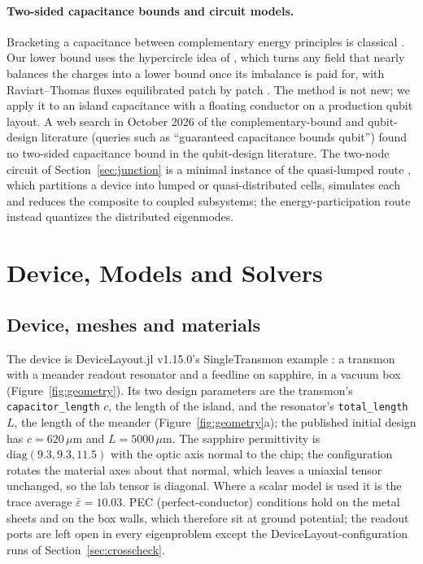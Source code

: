 \documentclass{anvil-paper}
\begin{document}
\paragraph{Two-sided capacitance bounds and circuit models.}
Bracketing a capacitance between complementary energy principles is
classical \citep{specogna2011complementary}. Our lower bound uses the
hypercircle idea of \citet{prager1947approximations}, which turns any
field that nearly balances the charges into a lower bound once its
imbalance is paid for, with Raviart--Thomas
fluxes \citep{raviart1977mixed} equilibrated patch by patch
\citep{braess2007equilibrated,ern2015polynomial}. The method is not new; we
apply it to an island capacitance with a floating conductor on a
production qubit layout. A web search in October 2026 of the
complementary-bound and qubit-design literature (queries such as
``guaranteed capacitance bounds qubit'') found no two-sided capacitance
bound in the qubit-design literature. The two-node circuit of Section~\ref{sec:junction} is a minimal instance of
the quasi-lumped route \citep{minev2021circuit}, which partitions a device
into lumped or quasi-distributed cells, simulates each and reduces the
composite to coupled subsystems; the energy-participation route
\citep{minev2021energy} instead quantizes the distributed eigenmodes.

\section{Device, Models and Solvers}
\label{sec:setup}

\subsection{Device, meshes and materials}
\label{sec:geometry}

The device is DeviceLayout.jl v1.15.0's SingleTransmon example
\citep{devicelayout}: a transmon \citep{koch2007charge} with a meander readout resonator and a
feedline on sapphire, in a vacuum box (Figure~\ref{fig:geometry}). Its two
design parameters are the transmon's \texttt{capacitor\_length} $c$, the
length of the island, and the resonator's \texttt{total\_length} $L$, the
length of the meander (Figure~\ref{fig:geometry}a); the published initial design has
$c = 620\,\mu$m and $L = 5000\,\mu$m. The sapphire permittivity is
$\mathrm{diag}(9.3, 9.3, 11.5)$ with the optic axis normal to the chip;
the configuration rotates the material axes about that normal, which
leaves a uniaxial tensor unchanged, so the lab tensor is diagonal. Where a
scalar model is used it is the trace average $\bar\varepsilon = 10.03$.
PEC (perfect-conductor) conditions hold on the metal sheets and on the box
walls, which therefore sit at ground potential; the readout ports are left
open in every eigenproblem except the DeviceLayout-configuration runs of
Section~\ref{sec:crosscheck}.
\end{document}

